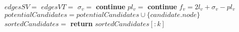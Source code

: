 \begin{algorithm}
{\begin{minipage}{\textwidth}
\begin{algorithmic}[1]
            
            \State $edgesSV=$
            \State $edgesVT=$
            \State $\sigma_v=$
                \State \textbf{continue} 
            \EndIf
            \State $pl_v=$
                \State \textbf{continue} 
            \EndIf
            \State $f_v=2l_v+\sigma_v-pl_v$
            \State $potentialCandidates  = potentialCandidates \cup \{candidate.node\}$
        \EndFor
        \State $sortedCandidates=$
        \State \textbf{return} $sortedCandidates[:k]$
    \EndProcedure

    
\end{algorithmic}
\end{minipage}%
}
\end{algorithm}



